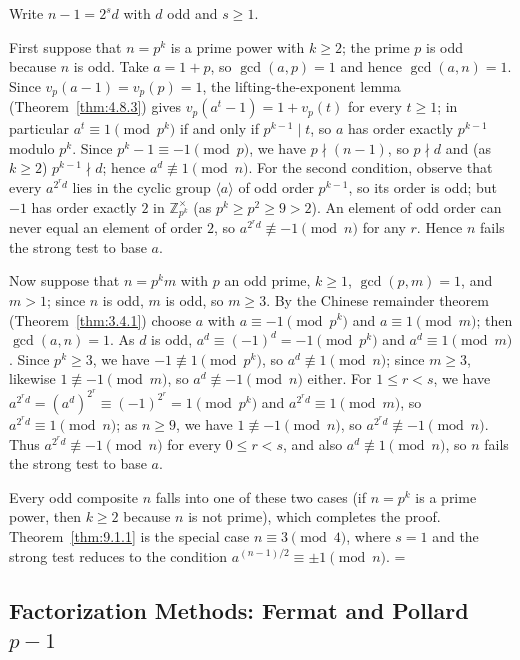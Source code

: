 \documentclass[11pt]{article}
\makeatletter
\let\nt@closedisplay\]
\def\nt@guardedclose{\@ifnextchar\par{\nt@closeafterpar}{\@ifnextchar\end{\postdisplaypenalty\@M\nt@closedisplay}{\nt@closedisplay}}}
\def\nt@closeafterpar\par{\@ifnextchar\par{\nt@closeafterpar}{\@ifnextchar\end{\postdisplaypenalty\@M\nt@closedisplay\par}{\nt@closedisplay\par}}}
\renewenvironment{proof}[1][\proofname]{\par
  \pushQED{\qed}\normalfont\topsep\medskipamount\edef\nt@afterproof{\@endparpenalty=\the\@endparpenalty\relax}\@beginparpenalty\@M\@endparpenalty\@M\let\]\nt@guardedclose\trivlist\item[]\textit{#1\@addpunct{.}} \ignorespaces}{\ifvmode\addpenalty\@M\fi\popQED\nt@afterproof\endtrivlist\@endpefalse}
\theoremstyle{ntstyle}
\newcommand{\ZmodUnits}[1]{\mathbb{Z}_{#1}^{\times}}
\makeatother
\begin{document}
\begin{proof} Write $n-1=2^{s}d$ with $d$ odd and $s\ge1$.

  First suppose that $n=p^{k}$ is a prime power with $k\ge2$; the prime
  $p$ is odd because $n$ is odd. Take $a=1+p$, so $\gcd(a, p)=1$ and
  hence $\gcd(a, n)=1$. Since
  $v_p(a-1)=v_p(p)=1$, the lifting-the-exponent lemma (Theorem~\ref{thm:4.8.3}) gives
  $v_p(a^{t}-1)=1+v_p(t)$ for every $t\ge1$; in particular
  $a^t\equiv1\pmod{p^k}$ if and only if $p^{k-1}\mid t$, so $a$ has order exactly
  $p^{k-1}$ modulo $p^k$. Since $p^k-1\equiv-1\pmod{p}$, we have $p\nmid(n-1)$,
  so $p\nmid d$ and (as $k\ge2$) $p^{k-1}\nmid d$; hence
  $a^{d}\not\equiv1\pmod{n}$. For the second condition, observe that every
  $a^{2^rd}$ lies in the cyclic group $\langle a\rangle$ of odd order
  $p^{k-1}$, so its order is odd; but $-1$ has order exactly $2$ in
  $\ZmodUnits{p^k}$ (as $p^k\ge p^2\ge9>2$). An
  element of odd order can never equal an element of order $2$, so
  $a^{2^{r}d}\not\equiv-1\pmod{n}$ for any $r$. Hence $n$ fails the
  strong test to base $a$.

  Now suppose that $n=p^{k}m$ with $p$ an odd prime, $k\ge1$,
  $\gcd(p, m)=1$, and $m>1$; since $n$ is odd, $m$ is odd, so $m\ge3$.
  By the
  Chinese remainder theorem (Theorem~\ref{thm:3.4.1}) choose $a$ with
  $a\equiv-1\pmod{p^k}$ and $a\equiv1\pmod{m}$; then $\gcd(a, n)=1$. As
  $d$ is odd, $a^{d}\equiv(-1)^d=-1\pmod{p^{k}}$ and $a^{d}\equiv1\pmod{m}$. Since $p^{k}\ge3$, we have
  $-1\not\equiv1\pmod{p^k}$, so
  $a^{d}\not\equiv1\pmod{n}$; since $m\ge3$, likewise $1\not\equiv-1\pmod{m}$, so
  $a^{d}\not\equiv-1\pmod{n}$ either. For $1\le r<s$, we have
  $a^{2^{r}d}=(a^{d})^{2^{r}}\equiv(-1)^{2^r}=1\pmod{p^{k}}$ and
  $a^{2^{r}d}\equiv1\pmod{m}$, so $a^{2^{r}d}\equiv1\pmod{n}$; as $n\ge9$,
  we have $1\not\equiv-1\pmod{n}$, so $a^{2^{r}d}\not\equiv-1\pmod{n}$. Thus
  $a^{2^{r}d}\not\equiv-1\pmod{n}$ for every $0\le r<s$, and also
  $a^{d}\not\equiv1\pmod{n}$, so $n$ fails the strong test to base $a$.

  Every odd composite $n$ falls into one of these two cases (if $n=p^{k}$ is a prime power, then $k\ge2$ because
  $n$ is not prime), which completes the
  proof. Theorem~\ref{thm:9.1.1} is the special case $n\equiv3\pmod{4}$, where
  $s=1$ and the strong test reduces to the condition
  $a^{(n-1)/2}\equiv\pm1\pmod{n}$.
\end{proof}
\subsection{Factorization Methods: Fermat and Pollard \texorpdfstring{$p-1$}{p-1}}
\end{document}
